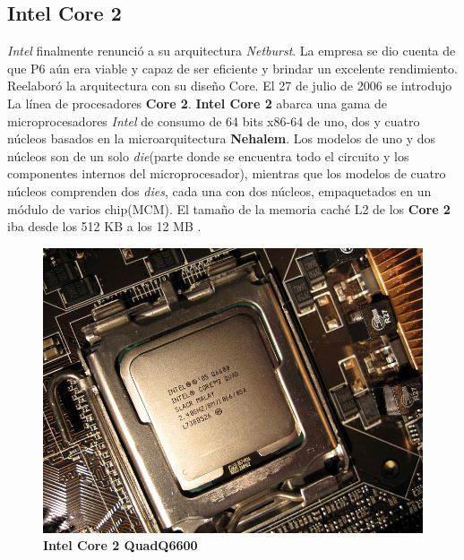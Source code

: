 \subsection{\textbf{Intel Core 2}}
\emph{Intel} finalmente renunció a su arquitectura \emph{Netburst}. La empresa se dio cuenta de que P6 aún era viable y capaz de ser eficiente y brindar 
un excelente rendimiento. Reelaboró la arquitectura con su diseño Core. El 27 de julio de 2006 se introdujo La línea de procesadores \textbf{Core 2}.
\textbf{Intel Core 2} abarca una gama de microprocesadores \emph{Intel} de consumo de 64 bits x86-64 de uno, dos y cuatro 
núcleos basados en la microarquitectura \textbf{Nehalem}. Los modelos de uno y dos núcleos son de un solo \emph{die}(parte donde se encuentra 
todo el circuito y los componentes internos del microprocesador), mientras que los modelos de cuatro núcleos comprenden dos \emph{dies}, cada una con dos núcleos, 
empaquetados en un módulo de varios chip(MCM). El tamaño de la memoria caché  L2 de los \textbf{Core 2} iba desde los 512 KB a los 
12 MB .

\begin{figure}[htb]
	\centering
	\includegraphics[scale = 0.8]{Graphics/IntelCore_2_Q6600.jpeg}
	\caption{\textbf{Intel Core 2 QuadQ6600}}
	\label{fig:24}
\end{figure}
\newpage

